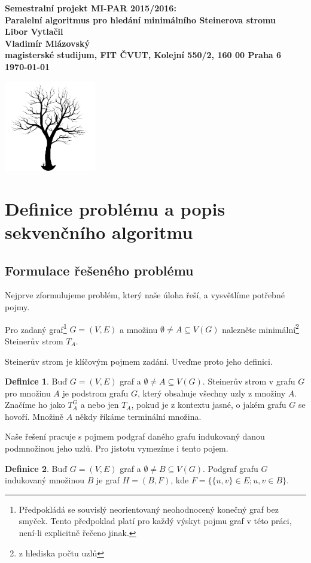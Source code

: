 \documentclass[12pt]{article}
\theoremstyle{definition}
\newtheorem{definice}{Definice}
\begin{document}

\begin{center}
\bf Semestralní projekt MI-PAR 2015/2016:\\[5mm]
    Paralelní algoritmus pro hledání minimálního Steinerova stromu	\\[5mm]
       Libor Vytlačil\\
       Vladimír Mlázovský\\[2mm]
magisterské studijum, FIT ČVUT, Kolejní 550/2, 160 00 Praha 6\\[2mm]
\today

\vspace{2cm}
\includegraphics[width=0.3\textwidth]{obr/tree.png}
\end{center}
\newpage
\tableofcontents
\newpage
\section{Definice problému a popis sekvenčního algoritmu}
\subsection{Formulace řešeného problému}
Nejprve zformulujeme problém, který naše úloha řeší, a vysvětlíme potřebné pojmy.

Pro zadaný graf\footnote{Předpokládá se souvislý neorientovaný neohodnocený konečný graf bez smyček. Tento předpoklad platí pro každý výskyt pojmu graf v této práci, není-li explicitně řečeno jinak.} $G=(V,E)$
a množinu $\emptyset\neq A\subseteq V(G)$ nalezněte minimální\footnote{z hlediska počtu uzlů} Steinerův strom $T_A$.

Steinerův strom je klíčovým pojmem zadání. Uveďme proto jeho definici.
\begin{definice}
	Buď $G=(V,E)$ graf a $\emptyset\neq A\subseteq V(G)$. Steinerův strom v grafu $G$ pro množinu $A$ je podstrom grafu $G$, který obsahuje všechny uzly z množiny $A$. Značíme ho jako $T_A^G$ a nebo jen $T_A$, pokud je z kontextu jasné, o jakém grafu $G$ se hovoří. Množině $A$ někdy říkáme terminální množina.
\end{definice}
Naše řešení pracuje s pojmem podgraf daného grafu indukovaný danou podmnožinou jeho uzlů. Pro jistotu vymezíme i tento pojem.
\begin{definice}
	Buď $G=(V,E)$ graf a $\emptyset\neq B\subseteq V(G)$. Podgraf grafu $G$ indukovaný množinou $B$ je graf $H=(B,F)$, kde
	$F=\{\{u,v\}\in E;u,v\in B \}.$
\end{definice}
\end{document}
